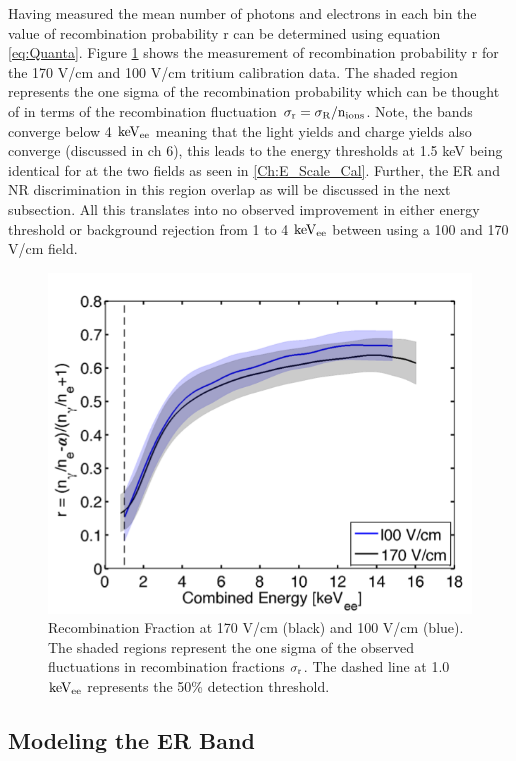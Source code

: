 Having measured the mean number of photons and electrons in each bin the value of recombination probability r can be determined using equation \ref{eq:Quanta}. Figure \ref{fig:R_T} shows the measurement of recombination probability r for the 170 V/cm and 100 V/cm tritium calibration data. The shaded region represents the one sigma of the recombination probability which can be thought of in terms of the recombination fluctuation $\rm \sigma_r = \sigma_R / n_{ions} $. Note, the bands converge below 4 $\rm keV_{ee}$ meaning that the light yields and charge yields also converge (discussed in ch 6), this leads to the energy thresholds at 1.5 keV being identical for at the two fields as seen in \ref{Ch:E_Scale_Cal}. Further, the ER and NR discrimination in this region overlap as will be discussed in the next subsection. All this translates into no observed improvement in either energy threshold or background rejection from 1 to 4 $\rm keV_{ee}$ between using a 100 and 170 V/cm field.

\begin{figure}[h!]\centering
\includegraphics[width=120mm]{Chapter_Flucs/Figures/Iter1_100/R_comp.png}
\caption{Recombination Fraction at 170 V/cm (black) and 100 V/cm (blue). The shaded regions represent the one sigma of the observed fluctuations in recombination fractions $\rm \sigma_r$. The dashed line at 1.0 $\rm keV_{ee}$ represents the 50\% detection threshold.}
\label{fig:R_T}
\end{figure}


\subsection{Modeling the ER Band}

